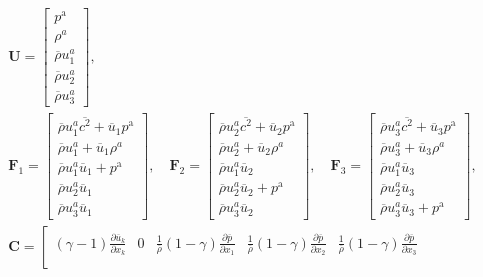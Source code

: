 \begin{gather}
\boldsymbol{U} =  \left[\begin{matrix}
    p^\mathrm{a}\\ 
    \rho^a\\
    \overline{\rho}u^a_1\\ 
    \overline{\rho}u^a_2\\
    \overline{\rho}u^a_3
\end{matrix}\right],
\\ 
\boldsymbol{F}_1 = \left[\begin{matrix}
    \overline{\rho}u^a_1 \overline{c^2} + \overline{u}_1 p^\mathrm{a}\\
    \overline{\rho}u^a_1 + \overline{u}_1 \rho^a\\
    \overline{\rho}u^a_1 \overline{u}_1 + p^\mathrm{a}\\
    \overline{\rho}u^a_2 \overline{u}_1\\
    \overline{\rho}u^a_3 \overline{u}_1
\end{matrix}\right],
\quad 
\boldsymbol{F}_2 = \left[\begin{matrix}
    \overline{\rho}u^a_2 \overline{c^2} + \overline{u}_2 p^\mathrm{a}\\
    \overline{\rho}u^a_2 + \overline{u}_2 \rho^a\\
    \overline{\rho}u^a_1 \overline{u}_2\\
    \overline{\rho}u^a_2 \overline{u}_2 + p^\mathrm{a}\\
    \overline{\rho}u^a_3 \overline{u}_2
\end{matrix}\right],
\quad 
\boldsymbol{F}_3 = \left[\begin{matrix}
    \overline{\rho}u^a_3 \overline{c^2} + \overline{u}_3 p^\mathrm{a}\\
    \overline{\rho}u^a_3 + \overline{u}_3 \rho^a\\
    \overline{\rho}u^a_1 \overline{u}_3\\
    \overline{\rho}u^a_2 \overline{u}_3\\
    \overline{\rho}u^a_3 \overline{u}_3 + p^\mathrm{a}
\end{matrix}\right], 
\\
\boldsymbol{C} = \left[\begin{matrix}
    \left(\gamma - 1\right) \frac{\partial \overline{u}_k}{\partial x_k}  & 0 & \frac{1}{\overline{\rho}} \left(1 - \gamma\right) \frac{\partial \overline{p}}{\partial x_1} & \frac{1}{\overline{\rho}} \left(1 - \gamma\right) \frac{\partial \overline{p}}{\partial x_2} & \frac{1}{\overline{\rho}} \left(1 - \gamma\right) \frac{\partial \overline{p}}{\partial x_3} \\

\end{matrix}
\end{gather}
